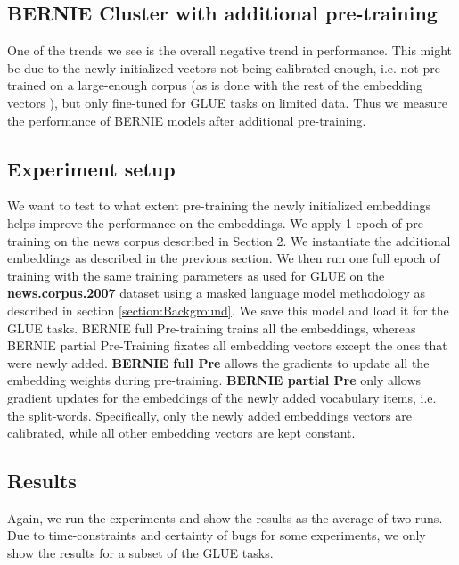 \documentclass[a4paper,12pt,oneside,openright]{report}
\begin{document}
\subsection{BERNIE Cluster with additional pre-training}

One of the trends we see is the overall negative trend in performance.
This might be due to the newly initialized vectors not being calibrated enough, i.e. not pre-trained on a large-enough corpus (as is done with the rest of the embedding vectors \cite{devlin18}), but only fine-tuned for GLUE tasks on limited data.
Thus we measure the performance of BERNIE models after additional pre-training.

\subsection{Experiment setup}

We want to test to what extent pre-training the newly initialized embeddings helps improve the performance on the embeddings.
We apply 1 epoch of pre-training on the news corpus described in Section 2.
We instantiate the additional embeddings as described in the previous section.
We then run one full epoch of training with the same training parameters as used for GLUE on the \textbf{news.corpus.2007} dataset using a masked language model methodology as described in section \ref{section:Background}.
We save this model and load it for the GLUE tasks.
BERNIE full Pre-training trains all the embeddings, whereas BERNIE partial Pre-Training fixates all embedding vectors except the ones that were newly added.
\textbf{BERNIE full Pre} allows the gradients to update all the embedding weights during pre-training.
\textbf{BERNIE partial Pre} only allows gradient updates for the embeddings of the newly added vocabulary items, i.e. the split-words.
Specifically, only the newly added embeddings vectors are calibrated, while all other embedding vectors are kept constant.

\subsection{Results}

Again, we run the experiments and show the results as the average of two runs.
Due to time-constraints and certainty of bugs for some experiments, we only show the results for a subset of the GLUE tasks.

\hfill \break
\end{document}

